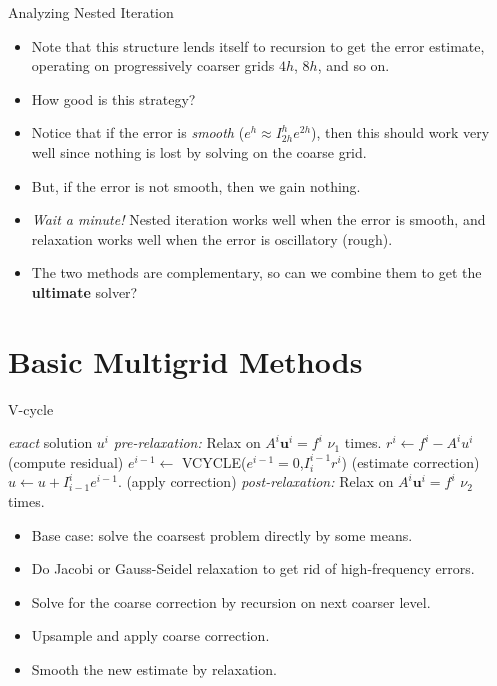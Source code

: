 \documentclass{beamer}
\begin{document}
\begin{frame}{Analyzing Nested Iteration}
 \begin{itemize}
  \item Note that this structure lends itself to recursion to get the error
        estimate, operating on progressively coarser grids $4h$, $8h$, and so on.
  \item How good is this strategy?
  \item Notice that if the error is \textit{smooth} ($e^h \approx I_{2h}^{h}e^{2h}$),
        then this should work very well since nothing is lost by solving on
        the coarse grid.
  \item But, if the error is not smooth, then we gain nothing.
  \item \textit{Wait a minute!} Nested iteration works well when the error
        is smooth, and relaxation works well when the error is oscillatory (rough).
  \item The two methods are complementary, so can we combine them to get the
        \textbf{ultimate} solver?
 \end{itemize}
\end{frame}

\section{Basic Multigrid Methods}%

\begin{frame}{V-cycle}
 \begin{algorithmic}[1]
   \Return \textit{exact} solution $u^i$
  \EndIf
  \State \textit{pre-relaxation:} Relax on $A^i\mathbf{u}^i = f^i$ $\nu_1$ times.
  \State $r^i \gets f^i - A^iu^i$ (compute residual)
  \State $e^{i-1} \gets$ VCYCLE($e^{i-1} = 0$,$I_i^{i-1}r^i$) (estimate correction)
  \State $u \gets u + I_{i-1}^i e^{i-1}$. (apply correction)
  \State \textit{post-relaxation:} Relax on $A^i\mathbf{u}^i = f^i$ $\nu_2$ times.
  \EndFunction
 \end{algorithmic}

 \begin{itemize}
  \item Base case: solve the coarsest problem directly by some means.
  \item Do Jacobi or Gauss-Seidel relaxation to get rid of high-frequency errors.
  \item Solve for the coarse correction by recursion on next coarser level.
  \item Upsample and apply coarse correction.
  \item Smooth the new estimate by relaxation.
 \end{itemize}
\end{frame}
\end{document}
